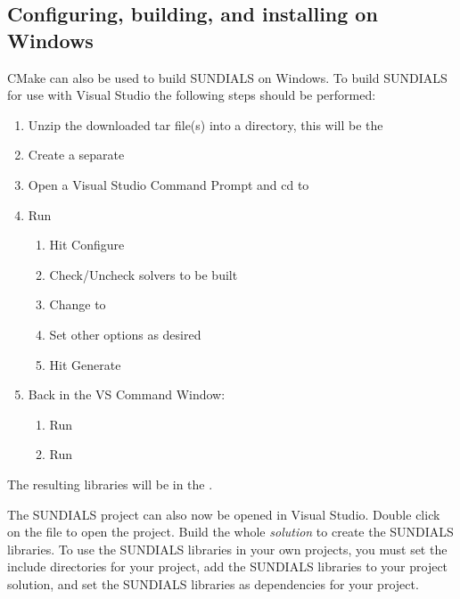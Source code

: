 \documentclass[letterpaper,10pt,english]{sphinxmanual}
\begin{document}
\subsection{Configuring, building, and installing on Windows}
\label{Install:installation-cmake-windows}\label{Install:configuring-building-and-installing-on-windows}
CMake can also be used to build SUNDIALS on Windows. To build SUNDIALS
for use with Visual Studio the following steps should be performed:
\begin{enumerate}
\item {} 
Unzip the downloaded tar file(s) into a directory, this will be the

\item {} 
Create a separate 

\item {} 
Open a Visual Studio Command Prompt and cd to 

\item {} 
Run 
\begin{enumerate}
\item {} 
Hit Configure

\item {} 
Check/Uncheck solvers to be built

\item {} 
Change  to 

\item {} 
Set other options as desired

\item {} 
Hit Generate

\end{enumerate}

\item {} 
Back in the VS Command Window:
\begin{enumerate}
\item {} 
Run 

\item {} 
Run 

\end{enumerate}

\end{enumerate}

The resulting libraries will be in the .

The SUNDIALS project can also now be opened in Visual Studio.
Double click on the  file to open the project.
Build the whole \emph{solution} to create the SUNDIALS libraries.
To use the SUNDIALS libraries in your own projects, you must
set the include directories for your project,
add the SUNDIALS libraries to your project solution,
and set the SUNDIALS libraries as dependencies for your project.
\end{document}
